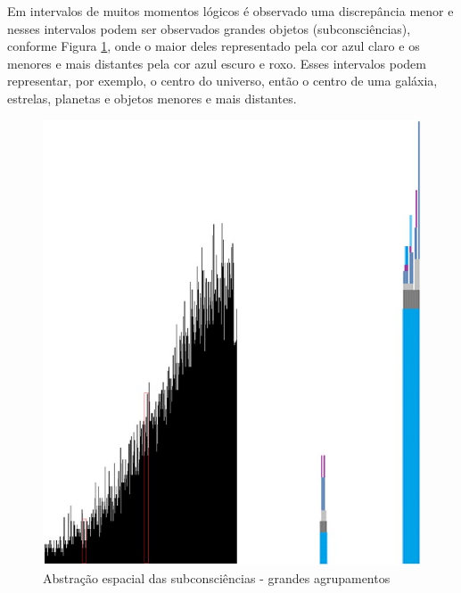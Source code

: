 Em intervalos de muitos momentos lógicos é observado uma discrepância menor e nesses intervalos podem ser observados grandes objetos (subconsciências), conforme Figura \ref{fig:consciousness_space_subconsciousness}, onde o maior deles representado pela cor azul claro e os menores e mais distantes pela cor azul escuro e roxo. Esses intervalos podem representar, por exemplo, o centro do universo, então o centro de uma galáxia, estrelas, planetas e objetos menores e mais distantes.
	\begin{figure}[H]
	\caption{Abstração espacial das subconsciências - grandes agrupamentos}
	\label{fig:consciousness_space_subconsciousness}
	\centering
	\includegraphics[scale=.45]{sections/images/consciousness_space_subconsciousness.jpg}
	\end{figure}

